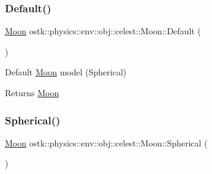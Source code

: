 \mbox{\label{classostk_1_1physics_1_1env_1_1obj_1_1celest_1_1_moon_a20b7b36974130f942a113b05c4544a03}} 
\subsubsection{\texorpdfstring{Default()}{Default()}}
{\footnotesize\ttfamily \hyperlink{classostk_1_1physics_1_1env_1_1obj_1_1celest_1_1_moon}{Moon} ostk\+::physics\+::env\+::obj\+::celest\+::\+Moon\+::\+Default (\begin{DoxyParamCaption}{ }\end{DoxyParamCaption})\hspace{0.3cm}{\ttfamily [static]}}



Default \hyperlink{classostk_1_1physics_1_1env_1_1obj_1_1celest_1_1_moon}{Moon} model (Spherical) 

\begin{DoxyReturn}{Returns}
\hyperlink{classostk_1_1physics_1_1env_1_1obj_1_1celest_1_1_moon}{Moon} 
\end{DoxyReturn}
\mbox{\label{classostk_1_1physics_1_1env_1_1obj_1_1celest_1_1_moon_a88731f2b1fde53140ce68d004f2a8aa9}} 
\subsubsection{\texorpdfstring{Spherical()}{Spherical()}}
{\footnotesize\ttfamily \hyperlink{classostk_1_1physics_1_1env_1_1obj_1_1celest_1_1_moon}{Moon} ostk\+::physics\+::env\+::obj\+::celest\+::\+Moon\+::\+Spherical (\begin{DoxyParamCaption}{ }\end{DoxyParamCaption})\hspace{0.3cm}{\ttfamily [static]}}



